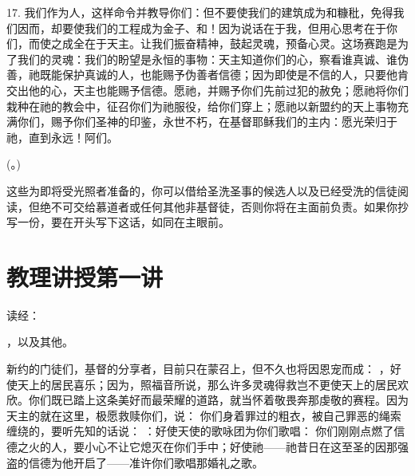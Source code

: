 17. 我们作为人，这样命令并教导你们：但不要使我们的建筑成为和糠秕，免得我们因而，却要使我们的工程成为金子、和！因为说话在于我，但用心思考在于你们，而使之成全在于天主。让我们振奋精神，鼓起灵魂，预备心灵。这场赛跑是为了我们的灵魂：我们的盼望是永恒的事物：天主知道你们的心，察看谁真诚、谁伪善，祂既能保护真诚的人，也能赐予伪善者信德；因为即使是不信的人，只要他肯交出他的心，天主也能赐予信德。愿祂，并赐予你们先前过犯的赦免；愿祂将你们栽种在祂的教会中，征召你们为祂服役，给你们穿上；愿祂以新盟约的天上事物充满你们，赐予你们圣神的印鉴，永世不朽，在基督耶稣我们的主内：愿光荣归于祂，直到永远！阿们。\par

(。)\par

这些为即将受光照者准备的，你可以借给圣洗圣事的候选人以及已经受洗的信徒阅读，但绝不可交给慕道者或任何其他非基督徒，否则你将在主面前负责。如果你抄写一份，要在开头写下这话，如同在主眼前。\par



\section{教理讲授第一讲}

\par

读经：\par

，以及其他。\par

新约的门徒们，基督的分享者，目前只在蒙召上，但不久也将因恩宠而成： ，好使天上的居民喜乐；因为，照福音所说，那么许多灵魂得救岂不更使天上的居民欢欣。你们既已踏上这条美好而最荣耀的道路，就当怀着敬畏奔那虔敬的赛程。因为天主的就在这里，极愿救赎你们，说：  你们身着罪过的粗衣，被自己罪恶的绳索缠绕的，要听先知的话说： ：好使天使的歌咏团为你们歌唱： 你们刚刚点燃了信德之火的人，要小心不让它熄灭在你们手中；好使祂——祂昔日在这至圣的因那强盗的信德为他开启了——准许你们歌唱那婚礼之歌。\par


